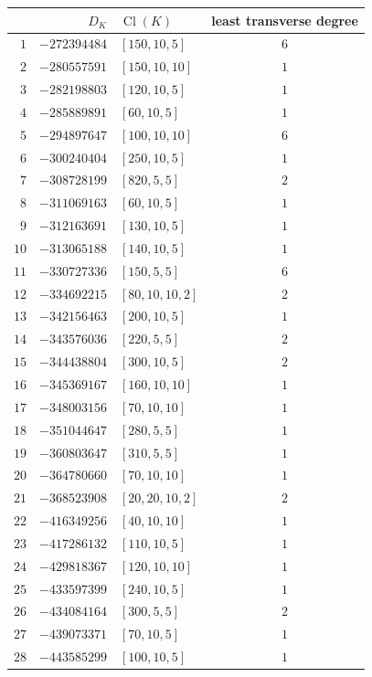 \documentclass[11pt]{article}
\newcommand{\Cl}{\operatorname{Cl}}
\begin{document}
\begin{center}\small
\setlength{\tabcolsep}{4.5pt}%
\begin{longtable}{r r l c}
\toprule
& $D_K$ & $\Cl(K)$ & least transverse degree \\
\midrule
\endhead
\bottomrule
\endfoot
$1$ & $-272394484$ & $[150,10,5]$ & $6$\\
$2$ & $-280557591$ & $[150,10,10]$ & $1$\\
$3$ & $-282198803$ & $[120,10,5]$ & $1$\\
$4$ & $-285889891$ & $[60,10,5]$ & $1$\\
$5$ & $-294897647$ & $[100,10,10]$ & $6$\\
$6$ & $-300240404$ & $[250,10,5]$ & $1$\\
$7$ & $-308728199$ & $[820,5,5]$ & $2$\\
$8$ & $-311069163$ & $[60,10,5]$ & $1$\\
$9$ & $-312163691$ & $[130,10,5]$ & $1$\\
$10$ & $-313065188$ & $[140,10,5]$ & $1$\\
$11$ & $-330727336$ & $[150,5,5]$ & $6$\\
$12$ & $-334692215$ & $[80,10,10,2]$ & $2$\\
$13$ & $-342156463$ & $[200,10,5]$ & $1$\\
$14$ & $-343576036$ & $[220,5,5]$ & $2$\\
$15$ & $-344438804$ & $[300,10,5]$ & $2$\\
$16$ & $-345369167$ & $[160,10,10]$ & $1$\\
$17$ & $-348003156$ & $[70,10,10]$ & $1$\\
$18$ & $-351044647$ & $[280,5,5]$ & $1$\\
$19$ & $-360803647$ & $[310,5,5]$ & $1$\\
$20$ & $-364780660$ & $[70,10,10]$ & $1$\\
$21$ & $-368523908$ & $[20,20,10,2]$ & $2$\\
$22$ & $-416349256$ & $[40,10,10]$ & $1$\\
$23$ & $-417286132$ & $[110,10,5]$ & $1$\\
$24$ & $-429818367$ & $[120,10,10]$ & $1$\\
$25$ & $-433597399$ & $[240,10,5]$ & $1$\\
$26$ & $-434084164$ & $[300,5,5]$ & $2$\\
$27$ & $-439073371$ & $[70,10,5]$ & $1$\\
$28$ & $-443585299$ & $[100,10,5]$ & $1$\\

\end{longtable}
\end{center}
\end{document}
